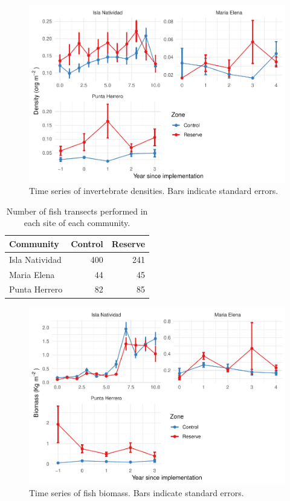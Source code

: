 \documentclass[utf8]{frontiers_suppmat} %
\begin{document}
\begin{figure}
\centering
\includegraphics{SupplementaryMaterial_files/figure-latex/unnamed-chunk-4-1.pdf}
\caption{\label{fig:unnamed-chunk-4}Time series of invertebrate densities.
Bars indicate standard errors.}
\end{figure}

\clearpage

\begin{table}

\caption{\label{tab:unnamed-chunk-5}Number of fish transects performed in each site of each community.}
\centering
\begin{tabular}[t]{lrr}
\toprule
Community & Control & Reserve\\
\midrule
Isla Natividad & 400 & 241\\
Maria Elena & 44 & 45\\
Punta Herrero & 82 & 85\\
\bottomrule
\end{tabular}
\end{table}

\begin{figure}
\centering
\includegraphics{SupplementaryMaterial_files/figure-latex/unnamed-chunk-6-1.pdf}
\caption{\label{fig:unnamed-chunk-6}Time series of fish biomass. Bars
indicate standard errors.}
\end{figure}
\end{document}

